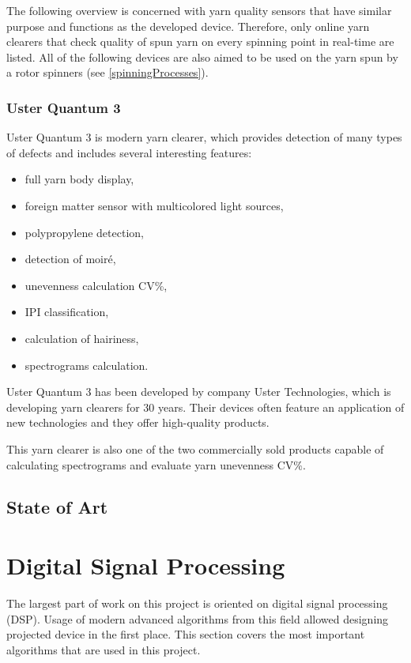 \documentclass[twoside]{ctuthesis}
\theoremstyle{plain}
\theoremstyle{definition}
\theoremstyle{note}
\begin{document}
The following overview is concerned with yarn quality sensors that have similar purpose and functions as the developed device. Therefore, only online yarn clearers that check quality of spun yarn on every spinning point in real-time are listed. All of the following devices are also aimed to be used on the yarn spun by a rotor spinners (see \ref{spinningProcesses}).

\subsubsection{Uster Quantum 3}
Uster Quantum 3 is modern yarn clearer, which provides detection of many types of defects and includes several interesting features:

\begin{itemize}
	\setlength{\itemsep}{5pt}
	\item full yarn body display,
	\item foreign matter sensor with multicolored light sources,
	\item polypropylene detection,
	\item detection of moiré,
	\item unevenness calculation CV\%,
	\item IPI classification,
	\item calculation of hairiness,
	\item spectrograms calculation.
\end{itemize}

Uster Quantum 3 has been developed by company Uster Technologies, which is developing yarn clearers for 30 years. Their devices often feature an application of new technologies and they offer high-quality products.

This yarn clearer is also one of the two commercially sold products capable of calculating spectrograms and evaluate yarn unevenness CV\%.

 
\subsection{State of Art}

\section{Digital Signal Processing}
The largest part of work on this project is oriented on digital signal processing (DSP). Usage of modern advanced algorithms from this field allowed designing projected device in the first place. This section covers the most important algorithms that are used in this project.
	
\end{document}
